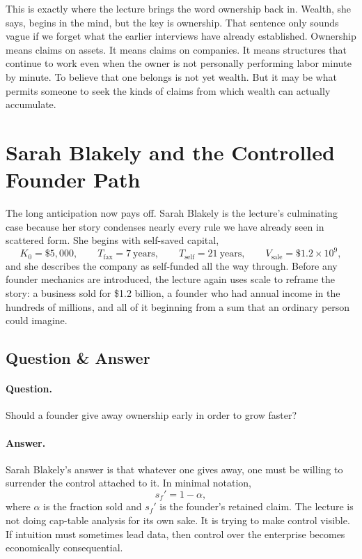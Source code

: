This is exactly where the lecture brings the word ownership back in. Wealth, she says, begins in the mind, but the key is ownership. That sentence only sounds vague if we forget what the earlier interviews have already established. Ownership means claims on assets. It means claims on companies. It means structures that continue to work even when the owner is not personally performing labor minute by minute. To believe that one belongs is not yet wealth. But it may be what permits someone to seek the kinds of claims from which wealth can actually accumulate.

\section{Sarah Blakely and the Controlled Founder Path}

The long anticipation now pays off. Sarah Blakely is the lecture's culminating case because her story condenses nearly every rule we have already seen in scattered form. She begins with self-saved capital,
\begin{equation}
K_0 = \$5{,}000,\qquad T_{\mathrm{fax}} = 7\ \text{years},\qquad T_{\mathrm{self}} = 21\ \text{years},\qquad V_{\mathrm{sale}} = \$1.2 \times 10^{9},
\end{equation}
and she describes the company as self-funded all the way through. Before any founder mechanics are introduced, the lecture again uses scale to reframe the story: a business sold for \$1.2 billion, a founder who had annual income in the hundreds of millions, and all of it beginning from a sum that an ordinary person could imagine.

\subsection{Question \& Answer}

\paragraph{Question.} Should a founder give away ownership early in order to grow faster?

\paragraph{Answer.} Sarah Blakely's answer is that whatever one gives away, one must be willing to surrender the control attached to it. In minimal notation,
\begin{equation}
s_f' = 1-\alpha,
\end{equation}
where \(\alpha\) is the fraction sold and \(s_f'\) is the founder's retained claim. The lecture is not doing cap-table analysis for its own sake. It is trying to make control visible. If intuition must sometimes lead data, then control over the enterprise becomes economically consequential.

